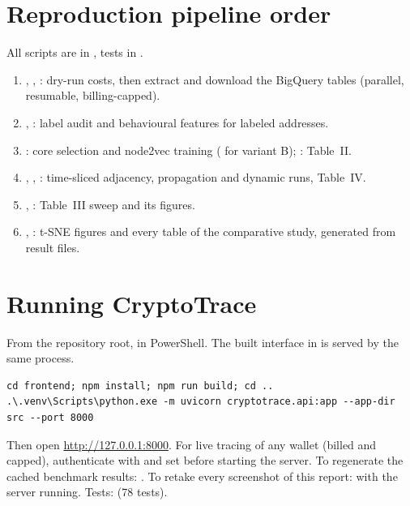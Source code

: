 \section{Reproduction pipeline order}
All scripts are in , tests in .
\begin{enumerate}[label=\arabic*.]
\item {}, , : dry-run costs, then extract and download the BigQuery tables (parallel, resumable, billing-capped).
\item {}, : label audit and behavioural features for labeled addresses.
\item {}: core selection and node2vec training ( for variant B); : Table~II.
\item {}, , : time-sliced adjacency, propagation and dynamic runs, Table~IV.
\item {}, : Table~III sweep and its figures.
\item {}, : t-SNE figures and every table of the comparative study, generated from result files.
\end{enumerate}

\section{Running CryptoTrace}
From the repository root, in PowerShell. The built interface in  is served by the same process.
\begin{verbatim}
cd frontend; npm install; npm run build; cd ..
.\.venv\Scripts\python.exe -m uvicorn cryptotrace.api:app --app-dir src --port 8000
\end{verbatim}
Then open \url{http://127.0.0.1:8000}. For live tracing of any wallet (billed and capped), authenticate with  and set  before starting the server. To regenerate the cached benchmark results: . To retake every screenshot of this report:  with the server running. Tests:  (78 tests).

